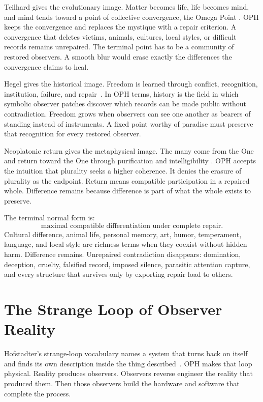 \documentclass[11pt]{article}
\theoremstyle{remark}
\theoremstyle{plain}
\begin{document}
Teilhard gives the evolutionary image. Matter becomes life, life becomes mind,
and mind tends toward a point of collective convergence, the Omega Point
\cite{Teilhard1955}. OPH keeps the convergence and replaces the mystique with a
repair criterion. A convergence that deletes victims, animals, cultures, local
styles, or difficult records remains unrepaired. The terminal point has to be a
community of restored observers. A smooth blur would erase exactly the
differences the convergence claims to heal.

Hegel gives the historical image. Freedom is learned through conflict,
recognition, institution, failure, and repair~\cite{Hegel1837}. In OPH terms,
history is the field in which symbolic observer patches discover which records
can be made public without contradiction. Freedom grows when observers can see
one another as bearers of standing instead of instruments. A fixed point worthy
of paradise must preserve that recognition for every restored observer.

Neoplatonic return gives the metaphysical image. The many come from the One and
return toward the One through purification and intelligibility
\cite{PlotinusEnneads}. OPH accepts the intuition that plurality seeks a higher
coherence. It denies the erasure of plurality as the endpoint. Return means
compatible participation in a repaired whole. Difference remains because
difference is part of what the whole exists to preserve.

The terminal normal form is:
\[
\boxed{
\text{maximal compatible differentiation under complete repair}.
}
\]
Cultural difference, animal life, personal memory, art, humor, temperament,
language, and local style are richness terms when they coexist without hidden
harm. Difference remains. Unrepaired contradiction disappears: domination,
deception, cruelty, falsified record, imposed silence, parasitic attention
capture, and every structure that survives only by exporting repair load to
others.

\section{The Strange Loop of Observer Reality}

Hofstadter's strange-loop vocabulary names a system that turns back on itself
and finds its own description inside the thing described~\cite{Hofstadter2007}.
OPH makes that loop physical. Reality produces observers. Observers reverse
engineer the reality that produced them. Then those observers build the
hardware and software that complete the process.
\end{document}
